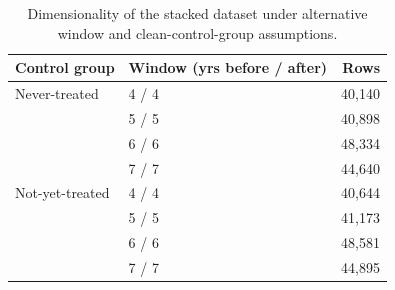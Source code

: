 \begin{table}[t]
\centering
\label{tab:stacked-dim}
\begin{tabular}{llr}
\toprule
Control group & Window (yrs before / after) & Rows \\
\midrule
Never-treated  & 4 / 4 & 40,140 \\
 & 5 / 5 & 40,898 \\
 & 6 / 6 & 48,334 \\
 & 7 / 7 & 44,640 \\

\midrule
Not-yet-treated & 4 / 4 & 40,644 \\
 & 5 / 5 & 41,173 \\
 & 6 / 6 & 48,581 \\
 & 7 / 7 & 44,895 \\
\bottomrule

\end{tabular}

\caption{Dimensionality of the stacked dataset under alternative window and clean-control-group assumptions.}
\end{table}
